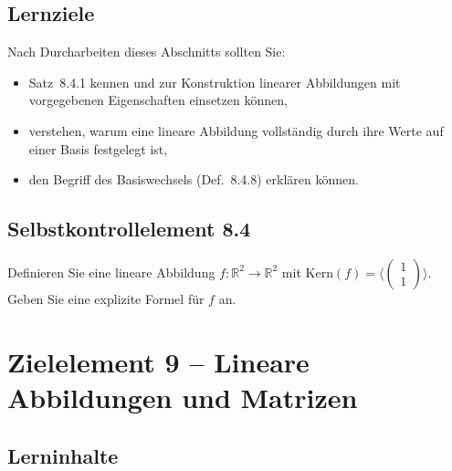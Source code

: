 \documentclass[a4paper,12pt]{article}
\begin{document}
\subsection*{Lernziele}

Nach Durcharbeiten dieses Abschnitts sollten Sie:
\begin{itemize}
  \item Satz~8.4.1 kennen und zur Konstruktion linearer Abbildungen mit
        vorgegebenen Eigenschaften einsetzen können,
  \item verstehen, warum eine lineare Abbildung vollständig durch ihre Werte
        auf einer Basis festgelegt ist,
  \item den Begriff des Basiswechsels (Def.~8.4.8) erklären können.
\end{itemize}

\subsection*{Selbstkontrollelement 8.4}

Definieren Sie eine lineare Abbildung $f: \mathbb{R}^2 \to \mathbb{R}^2$ mit
$\mathrm{Kern}(f) = \langle\begin{pmatrix}1\\1\end{pmatrix}\rangle$.
Geben Sie eine explizite Formel für $f$ an.

\newpage

\section*{Zielelement 9 -- Lineare Abbildungen und Matrizen}

\subsection*{Lerninhalte}
\end{document}
